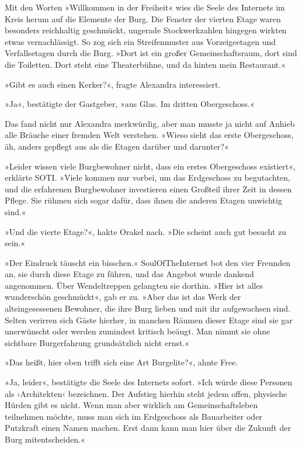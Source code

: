 Mit den Worten »Willkommen in der Freiheit« wies die Seele des Internets im Kreis herum auf die Elemente der Burg. Die Fenster der vierten Etage waren besonders reichhaltig geschmückt, ungerade Stockwerkzahlen hingegen wirkten etwas vernachlässigt. So zog sich ein Streifenmuster aus Vorzeigeetagen und Verfallsetagen durch die Burg. »Dort ist ein großer Gemeinschaftsraum, dort sind die Toiletten. Dort steht eine Theaterbühne, und da hinten mein Restaurant.«

»Gibt es auch einen Kerker?«, fragte Alexandra interessiert.

»Ja«, bestätigte der Gastgeber, »aus Glas. Im dritten Obergeschoss.«

Das fand nicht nur Alexandra merkwürdig, aber man musste ja nicht auf Anhieb alle Bräuche einer fremden Welt verstehen. »Wieso sieht das erste Obergeschoss, äh, anders gepflegt aus als die Etagen darüber und darunter?«

»Leider wissen viele Burgbewohner nicht, dass ein erstes Obergeschoss existiert«, erklärte SOTI. »Viele kommen nur vorbei, um das Erdgeschoss zu begutachten, und die erfahrenen Burgbewohner investieren einen Großteil ihrer Zeit in dessen Pflege. Sie rühmen sich sogar dafür, dass ihnen die anderen Etagen unwichtig sind.«

»Und die vierte Etage?«, hakte Orakel nach. »Die scheint auch gut besucht zu sein.«

»Der Eindruck täuscht ein bisschen.« SoulOfTheInternet bot den vier Freunden an, sie durch diese Etage zu führen, und das Angebot wurde dankend angenommen. Über Wendeltreppen gelangten sie dorthin. »Hier ist alles wunderschön geschmückt«, gab er zu. »Aber das ist das Werk der alteingesessenen Bewohner, die ihre Burg lieben und mit ihr aufgewachsen sind. Selten verirren sich Gäste hierher, in manchen Räumen dieser Etage sind sie gar unerwünscht oder werden zumindest kritisch beäugt. Man nimmt sie ohne sichtbare Burgerfahrung grundsätzlich nicht ernst.«

»Das heißt, hier oben trifft sich eine Art Burgelite?«, ahnte Free.

»Ja, leider«, bestätigte die Seele des Internets sofort. »Ich würde diese Personen als ›Architekten‹ bezeichnen. Der Aufstieg hierhin steht jedem offen, physische Hürden gibt es nicht. Wenn man aber wirklich am Gemeinschaftsleben teilnehmen möchte, muss man sich im Erdgeschoss als Bauarbeiter oder Putzkraft einen Namen machen. Erst dann kann man hier über die Zukunft der Burg mitentscheiden.«

